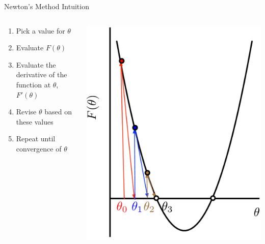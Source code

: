 \documentclass[aspectratio=169]{beamer}
\begin{document}
\begin{frame}{Newton's Method Intuition}

\begin{columns}[T]
\begin{column}{0.65\textwidth}
\begin{enumerate}
\item Pick a value for $\theta$
\item Evaluate $F(\theta)$
\item Evaluate the derivative of the function at $\theta$, $F'(\theta)$
\item Revise $\theta$ based on these values
\item Repeat until convergence of $\theta$
\end{enumerate}
\end{column}
\begin{column}{0.35\textwidth}
\includegraphics[width=1\textwidth]{lectNM/newtonV3.pdf}
\end{column}
\end{columns}
\end{frame}
\end{document}
